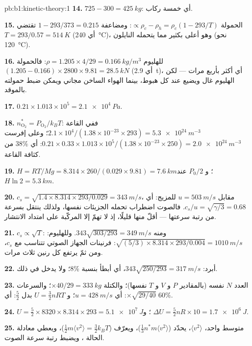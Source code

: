 \begin{solution}{pb:b1:kinetic-theory:1}
\textbf{14.} $725 - 300 = \qty{425}{kg}$: أي خمسة ركاب.

\textbf{15.} الحمولة $\propto \rho_c - \rho_h = \rho_c(1 - 293/T)$: ومضاعفة
$1 - 293/373 = 0.215$ تقتضي $T = 293/0.57 = \qty{514}{K}$ (أي \qty{240}{\degreeCelsius})،
وهو أعلى بكثير مما يتحمله النايلون (نحو \qty{120}{\degreeCelsius}).

\textbf{16.} للهليوم $\rho = 1.205 \times 4/29 = \qty{0.166}{kg/m^3}$: فالحمولة
$(1.205 - 0.166) \times 2800 \times 9.81 = \qty{28.5}{kN}$ (أي \qty{2.9}{t})، أي أكثر
بأربع مرات --- لكن الهليوم غال ويضيع عند كل هبوط، بينما
الهواء الساخن مجاني ويمكن ضبط حمولته بالموقد.

\textbf{17.} $0.21 \times 1.013\times10^5 = \qty{2.1e4}{Pa}$.

\textbf{18.} $n^*_{\mathrm{O}_2} = P_{\mathrm{O}_2}/k_BT$: ففي القاعة $2.1\times10^4/
(1.38\times10^{-23} \times 293) = \qty{5.3e24}{m^{-3}}$؛ وعلى إفرست $0.21 \times 0.33
\times 1.013\times10^5/(1.38\times10^{-23} \times 250) = \qty{2.0e24}{m^{-3}}$:
أي $38\%$ من كثافة القاعة.

\textbf{19.} $H = RT/Mg = 8.314 \times 260/(0.029 \times 9.81) = \qty{7.6}{km}$؛
و $P_0/2$ عند $H\ln 2 = \qty{5.3}{km}$.

\textbf{20.} $c_s = \sqrt{1.4 \times 8.314 \times 293/0.029} = \qty{343}{m/s}$،
مقابل $u = \qty{503}{m/s}$ للمزيج: أي $c_s/u = \sqrt{\gamma/3} = 0.68$.
فالصوت اضطراب تحمله الجزيئات نفسها، ولذلك ينتقل
بسرعة من رتبة سرعتها --- أقلّ منها قليلًا، إذ
لا تهمّ إلا المركّبة على امتداد الانتشار.

\textbf{21.} $c_s \propto \sqrt T$: ومنه $343\sqrt{303/293} = \qty{349}{m/s}$.
وللهليوم: $\sqrt{(5/3) \times 8.314 \times 293/0.004} = \qty{1010}{m/s}$: فرنينات
الجهاز الصوتي تتناسب مع $c_s$، ومن ثمّ يرتفع كل رنين
ثلاث مرات.

\textbf{22.} أبرد: $343\sqrt{250/293} = \qty{317}{m/s}$، أي أبطأ بنسبة $8\%$؛
ولا يدخل  في ذلك.

\textbf{23.} العدد $N$ نفسه (بالمقادير $P$ و $V$ و $T$ نفسها)؛ والكتلة $\times 40/29 = \qty{333}{kg}$؛
والسرعات $\times\sqrt{29/40}$: أي $u = \qty{428}{m/s}$؛ و $U = \tfrac32 nRT$ بدل
$\tfrac52$: أي $60\%$.

\textbf{24.} $U = \tfrac52 \times 8320 \times 8.314 \times 293 = \qty{5.1e7}{J}$؛
و $\Delta U = \tfrac52 nR \times 10 = \qty{1.7e6}{J}$.

\textbf{25.} متوسط واحد، $\langle v^2\rangle$، يحدّد 
($\tfrac13 n^*m\langle v^2\rangle$)، ويعرّف 
($\tfrac12 m\langle v^2\rangle = \tfrac32 k_BT$)، ويعطي معادلة الحالة
، ويضبط رتبة سرعة الصوت.
\end{solution}
